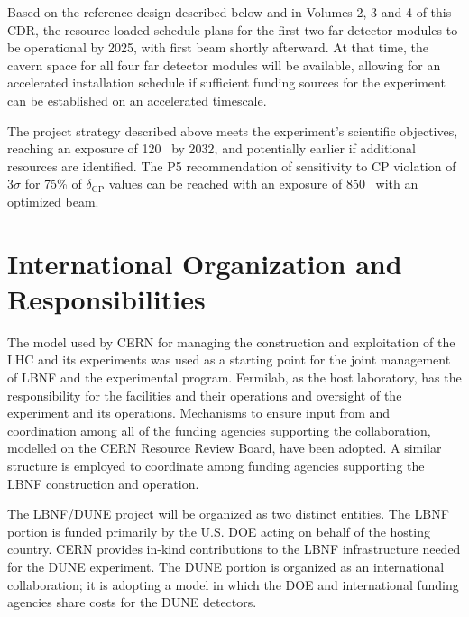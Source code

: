 Based on the reference design described below and in Volumes 2, 3 and 4 of this %
CDR, the resource-loaded schedule %
plans for the first two  far detector modules to be
operational by 2025,
with first beam shortly afterward. 
At that time, the cavern 
space for all four  far detector modules will be available, allowing for 
an accelerated installation schedule if sufficient funding sources for
the experiment can be established on an accelerated timescale.  

\vspace{6pt}
The project strategy described above meets the experiment's scientific objectives,
 reaching an exposure of 
\num{120}~\ktMWyr{} by 2032, and potentially earlier if additional resources are identified. 
The P5 recommendation of sensitivity to CP violation of 3$\sigma$ for 75\% of $\delta_\text{CP}$
values can be reached with an exposure of \num{850}~\ktMWyr{} with an optimized beam.

\section{International Organization and Responsibilities}

The
model used by CERN for managing the construction and exploitation of the LHC and its experiments was used as a starting point for the joint management of LBNF and the experimental program.  Fermilab, as the host laboratory, has the responsibility for the facilities and their operations 
and oversight of the experiment and its operations.  Mechanisms to ensure input from and coordination among all of the funding agencies supporting the collaboration, modelled on the CERN Resource Review Board, have been adopted. %
A similar structure is employed to coordinate among funding agencies supporting the LBNF construction and operation.  

The LBNF/DUNE project will be organized as two distinct entities. The LBNF portion is funded primarily
by the U.S. DOE acting on behalf of the hosting country.  CERN provides in-kind contributions to the LBNF infrastructure needed for the DUNE experiment. The DUNE portion is organized
as an international collaboration; it is adopting a model in which the DOE and international funding agencies share costs %
for the DUNE detectors.

